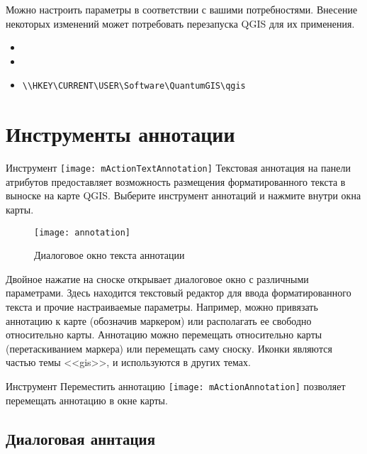 Можно настроить параметры в соответствии с вашими потребностями. Внесение
некоторых изменений может потребовать перезапуска QGIS для их применения.

\begin{itemize}
\item {}
\item {}
\item {}
\begin{verbatim}
\\HKEY\CURRENT\USER\Software\QuantumGIS\qgis
\end{verbatim}
\end{itemize}

\section{Инструменты аннотации}\label{sec:annotations}

Инструмент \texttt{[image: mActionTextAnnotation]}
Текстовая аннотация на панели атрибутов предоставляет возможность размещения
форматированного текста в выноске на карте QGIS. Выберите инструмент аннотаций
и нажмите внутри окна карты.

\begin{figure}[ht]
   \centering
   \texttt{[image: annotation]}
   \caption{Диалоговое окно текста аннотации \wincaption}
   \label{fig:annotation}
\end{figure}

Двойное нажатие на сноске открывает диалоговое окно с различными параметрами.
Здесь находится текстовый редактор для ввода форматированного текста и прочие
настраиваемые параметры. Например, можно привязать аннотацию к карте
(обозначив маркером) или располагать ее свободно относительно карты. Аннотацию
можно перемещать относительно карты (перетаскиванием маркера) или перемещать
саму сноску. Иконки являются частью темы <<gis>>, и используются в других
темах.

Инструмент Переместить аннотацию
\texttt{[image: mActionAnnotation]} позволяет
перемещать аннотацию в окне карты.

\subsection{Диалоговая аннтация}

